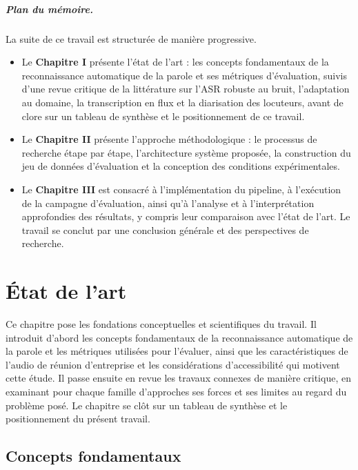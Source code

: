 \documentclass[12pt]{report}
\begin{document}
\paragraph{Plan du mémoire.}
La suite de ce travail est structurée de manière progressive.
\begin{itemize}
    \item Le \textbf{Chapitre I} présente l'état de l'art : les concepts fondamentaux de la reconnaissance automatique de la parole et ses métriques d'évaluation, suivis d'une revue critique de la littérature sur l'ASR robuste au bruit, l'adaptation au domaine, la transcription en flux et la diarisation des locuteurs, avant de clore sur un tableau de synthèse et le positionnement de ce travail.
    \item Le \textbf{Chapitre II} présente l'approche méthodologique : le processus de recherche étape par étape, l'architecture système proposée, la construction du jeu de données d'évaluation et la conception des conditions expérimentales.
    \item Le \textbf{Chapitre III} est consacré à l'implémentation du pipeline, à l'exécution de la campagne d'évaluation, ainsi qu'à l'analyse et à l'interprétation approfondies des résultats, y compris leur comparaison avec l'état de l'art. Le travail se conclut par une conclusion générale et des perspectives de recherche.
\end{itemize}
\newpage
\chapter{État de l'art}
Ce chapitre pose les fondations conceptuelles et scientifiques du travail. Il introduit d'abord les concepts fondamentaux de la reconnaissance automatique de la parole et les métriques utilisées pour l'évaluer, ainsi que les caractéristiques de l'audio de réunion d'entreprise et les considérations d'accessibilité qui motivent cette étude. Il passe ensuite en revue les travaux connexes de manière critique, en examinant pour chaque famille d'approches ses forces et ses limites au regard du problème posé. Le chapitre se clôt sur un tableau de synthèse et le positionnement du présent travail.
\section{Concepts fondamentaux}
\end{document}
